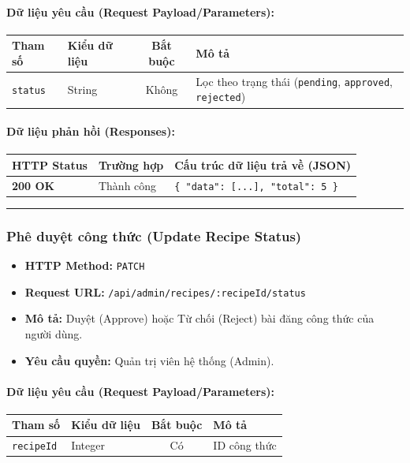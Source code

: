 \documentclass[12pt,a4paper]{article}
\begin{document}
\paragraph{Dữ liệu yêu cầu (Request Payload/Parameters):}
\begin{longtable}{|>{\raggedright\arraybackslash}p{2.8cm}|>{\raggedright\arraybackslash}p{2.2cm}|c|>{\raggedright\arraybackslash}p{7.0cm}|}
\hline
\textbf{Tham số} & \textbf{Kiểu dữ liệu} & \textbf{Bắt buộc} & \textbf{Mô tả} \\ \hline
\endhead
\texttt{status} & String & Không & Lọc theo trạng thái (\texttt{pending}, \texttt{approved}, \texttt{rejected}) \\ \hline
\end{longtable}

\paragraph{Dữ liệu phản hồi (Responses):}
\begin{longtable}{|>{\raggedright\arraybackslash}p{2.8cm}|>{\raggedright\arraybackslash}p{3.2cm}|>{\raggedright\arraybackslash}p{8.0cm}|}
\hline
\textbf{HTTP Status} & \textbf{Trường hợp} & \textbf{Cấu trúc dữ liệu trả về (JSON)} \\ \hline
\endhead
\textbf{200 OK} & Thành công & \texttt{\{ "data": [...], "total": 5 \}} \\ \hline
\end{longtable}

\vskip 0.4cm
\noindent\rule{\textwidth}{0.3pt}
\vskip 0.4cm

\subsubsection{Phê duyệt công thức (Update Recipe Status)}
\begin{itemize}[leftmargin=*]
    \item \textbf{HTTP Method:} \texttt{PATCH}
    \item \textbf{Request URL:} \texttt{/api/admin/recipes/:recipeId/status}
    \item \textbf{Mô tả:} Duyệt (Approve) hoặc Từ chối (Reject) bài đăng công thức của người dùng.
    \item \textbf{Yêu cầu quyền:} Quản trị viên hệ thống (Admin).
\end{itemize}

\paragraph{Dữ liệu yêu cầu (Request Payload/Parameters):}
\begin{longtable}{|>{\raggedright\arraybackslash}p{2.8cm}|>{\raggedright\arraybackslash}p{2.2cm}|c|>{\raggedright\arraybackslash}p{7.0cm}|}
\hline
\textbf{Tham số} & \textbf{Kiểu dữ liệu} & \textbf{Bắt buộc} & \textbf{Mô tả} \\ \hline
\endhead
\texttt{recipeId} & Integer & Có & ID công thức \\ \hline
\end{longtable}
\end{document}
